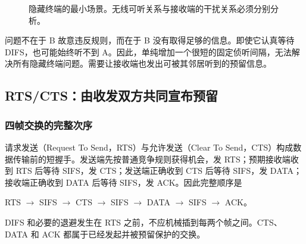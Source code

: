 \begin{figure}[htbp]
\centering
{}
\caption{隐藏终端的最小场景。无线可听关系与接收端的干扰关系必须分别分析。}
\end{figure}

问题不在于 B 故意违反规则，而在于 B 没有取得足够的信息。即使它认真等待 DIFS，也可能始终听不到 A。因此，单纯增加一个很短的固定侦听间隔，无法解决所有隐藏终端问题。需要让接收端也发出可被其邻居听到的预留信息。

\subsection{RTS/CTS：由收发双方共同宣布预留}

\subsubsection{四帧交换的完整次序}

请求发送（Request To Send，RTS）与允许发送（Clear To Send，CTS）构成数据传输前的短握手。发送端先按普通竞争规则获得机会，发 RTS；预期接收端收到 RTS 后等待 SIFS，发 CTS；发送端正确收到 CTS 后等待 SIFS，发 DATA；接收端正确收到 DATA 后等待 SIFS，发 ACK。因此完整顺序是
\begin{center}
RTS $\rightarrow$ SIFS $\rightarrow$ CTS $\rightarrow$ SIFS $\rightarrow$ DATA $\rightarrow$ SIFS $\rightarrow$ ACK。
\end{center}
DIFS 和必要的退避发生在 RTS 之前，不应机械插到每两个帧之间。CTS、DATA 和 ACK 都属于已经发起并被预留保护的交换。

